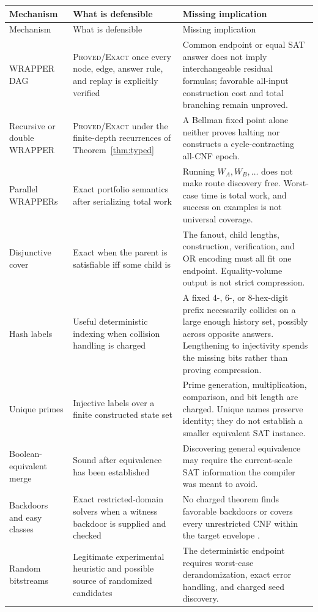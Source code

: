 \documentclass[11pt]{article}
\newcommand{\Exact}{\textsc{Proved/Exact}}
\begin{document}
\begin{longtable}{L{0.22\textwidth}L{0.31\textwidth}L{0.39\textwidth}}
\toprule
Mechanism & What is defensible & Missing implication \\
\midrule
\endfirsthead
\toprule
Mechanism & What is defensible & Missing implication \\
\midrule
\endhead
\bottomrule
\endfoot
WRAPPER DAG & \Exact{} once every node, edge, answer rule, and replay is
explicitly verified & Common endpoint or equal SAT answer does not imply
interchangeable residual formulas; favorable all-input construction cost and
total branching remain unproved. \\
Recursive or double WRAPPER & \Exact{} under the finite-depth recurrences of
Theorem~\ref{thm:typed} & A Bellman fixed point alone neither proves halting
nor constructs a cycle-contracting all-CNF epoch. \\
Parallel WRAPPERs & Exact portfolio semantics after serializing total work &
Running $W_A,W_B,\ldots$ does not make route discovery free.  Worst-case
time is total work, and success on examples is not universal coverage. \\
Disjunctive cover & Exact when the parent is satisfiable iff some child is &
The fanout, child lengths, construction, verification, and OR encoding must
all fit one endpoint.  Equality-volume output is not strict compression. \\
Hash labels & Useful deterministic indexing when collision handling is
charged & A fixed 4-, 6-, or 8-hex-digit prefix necessarily collides on a
large enough history set, possibly across opposite answers.  Lengthening to
injectivity spends the missing bits rather than proving compression. \\
Unique primes & Injective labels over a finite constructed state set & Prime
generation, multiplication, comparison, and bit length are charged.  Unique
names preserve identity; they do not establish a smaller equivalent SAT
instance. \\
Boolean-equivalent merge & Sound after equivalence has been established &
Discovering general equivalence may require the current-scale SAT
information the compiler was meant to avoid. \\
Backdoors and easy classes & Exact restricted-domain solvers when a witness
backdoor is supplied and checked & No charged theorem finds favorable
backdoors or covers every unrestricted CNF within the target envelope
\cite{maehlmann2021,dreier2022,ordyniak2021bdnf}. \\
Random bitstreams & Legitimate experimental heuristic and possible source of
randomized candidates & The deterministic endpoint requires worst-case
derandomization, exact error handling, and charged seed discovery. \\
\end{longtable}
\end{document}
